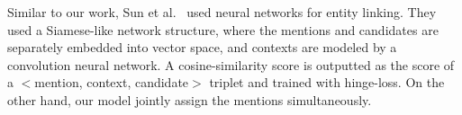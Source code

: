 Similar to our work, Sun et al.~ used neural networks for entity linking. They used a Siamese-like network structure, where the mentions and candidates are separately embedded into vector space,  and contexts are modeled by a convolution neural network. 
A cosine-similarity score is outputted as the score of a $<$mention, context, candidate$>$ triplet and trained with hinge-loss. On the other hand, our model jointly assign the mentions simultaneously.

